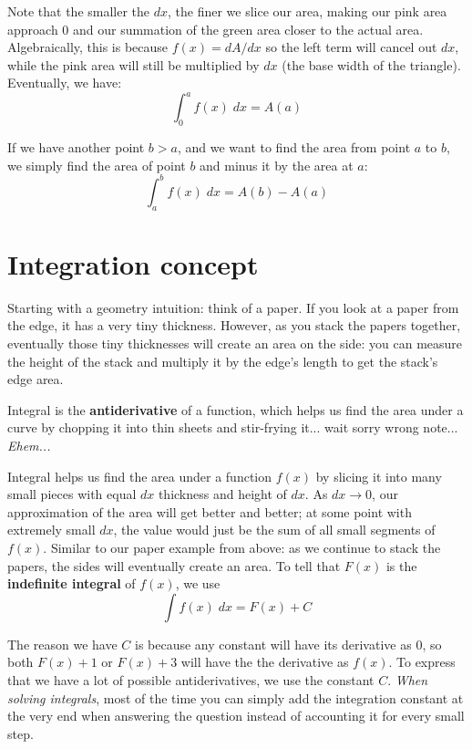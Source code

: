 Note that the smaller the $dx$, the finer we slice our area, making our pink area approach $0$ and our summation of the green area closer to the actual area. Algebraically, this is because $f(x)=dA/dx$ so the left term will cancel out $dx$, while the pink area will still be multiplied by $dx$ (the base width of the triangle). Eventually, we have:
\[
    \int^a_0 f(x) \;dx
    = A(a)
\]

If we have another point $b>a$, and we want to find the area from point $a$ to $b$, we simply find the area of point $b$ and minus it by the area at $a$:
\[
    \int^b_a f(x) \;dx
    = A(b) - A(a)
\]

\section{Integration concept}
Starting with a geometry intuition: think of a paper. If you look at a paper from the edge, it has a very tiny thickness. However, as you stack the papers together, eventually those tiny thicknesses will create an area on the side: you can measure the height of the stack and multiply it by the edge's length to get the stack's edge area.

Integral is the \textbf{antiderivative} of a function, which helps us find the area under a curve by chopping it into thin sheets and stir-frying it... wait sorry wrong note... \textit{Ehem...}

Integral helps us find the area under a function $f(x)$ by slicing it into many small pieces with equal $dx$ thickness and height of $dx$. As $dx\to0$, our approximation of the area will get better and better; at some point with extremely small $dx$, the value would just be the sum of all small segments of $f(x)$. Similar to our paper example from above: as we continue to stack the papers, the sides will eventually create an area. To tell that $F(x)$ is the \textbf{indefinite integral} of $f(x)$, we use
\begin{equation}
    \int f(x) \;dx = F(x) + C
\end{equation}

The reason we have $C$ is because any constant will have its derivative as $0$, so both $F(x)+1$ or $F(x)+3$ will have the the derivative as $f(x)$. To express that we have a lot of possible antiderivatives, we use the constant $C$. \textit{When solving integrals}, most of the time you can simply add the integration constant at the very end when answering the question instead of accounting it for every small step.

